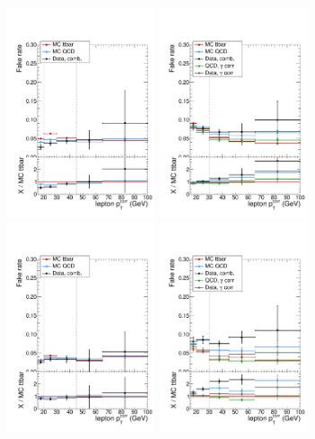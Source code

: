 \begin{figure}[htp]
\centering
\includegraphics[width=0.39\textwidth]{ch8_figs/fr_mu_barrel.pdf}
\includegraphics[width=0.39\textwidth]{ch8_figs/fr_el_barrel.pdf}\\
\includegraphics[width=0.39\textwidth]{ch8_figs/fr_mu_endcap.pdf}
\includegraphics[width=0.39\textwidth]{ch8_figs/fr_el_endcap.pdf}

\end{figure}
